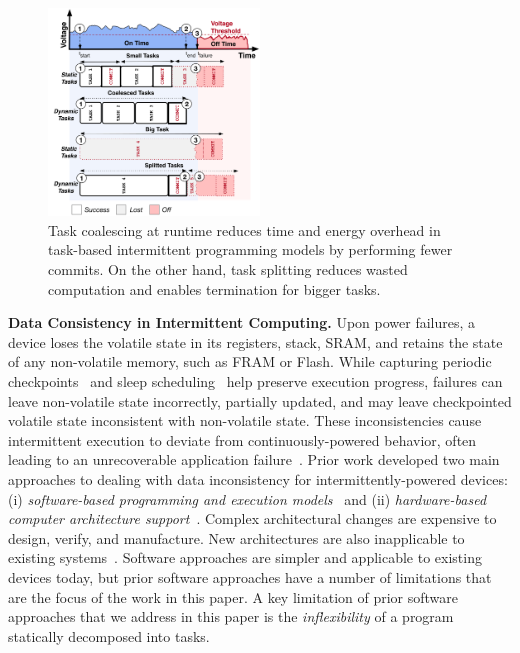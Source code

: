 \begin{figure}
    \centering
    \includegraphics[width=0.5\textwidth]{figures/graffle/intro-figure.pdf}
    \caption{Task coalescing at runtime reduces time and energy overhead in task-based intermittent programming models by performing fewer commits. On the other hand, task splitting reduces wasted computation and enables termination for bigger tasks.}
    \label{fig:coalesce}
\end{figure}

\textbf{Data Consistency in Intermittent Computing.}  
Upon power failures, a device loses the volatile
state in its registers, stack, SRAM, and retains the state of any non-volatile
memory, such as FRAM or Flash. While capturing periodic
checkpoints~\citep{mementos,quickrecall} and sleep
scheduling~\citep{dewdrop,hibernus,hibernusplusplus} help preserve execution
progress, failures can leave non-volatile state incorrectly, partially updated,
and may leave checkpointed volatile state inconsistent with non-volatile state.
These inconsistencies cause intermittent execution to deviate from
continuously-powered behavior, often leading to an unrecoverable
application failure~\citep{dino,edb}. Prior work developed two main approaches to dealing with data inconsistency for
intermittently-powered devices: (i) \emph{software-based programming and
execution models}~\citep{dino,ratchet,chain,alpaca} and (ii)
\emph{hardware-based computer architecture
support}~\citep{hicks_isca_2017,idetic,nvp}.  Complex architectural changes are
expensive to design, verify, and manufacture.  New architectures are also
inapplicable to existing systems~\citep{hicks_isca_2017,nvp}. Software
approaches are simpler and applicable to existing devices today, but prior
software approaches have a number of limitations that are the focus of the work
in this paper.  A key limitation of prior software approaches that we address in this paper is the {\em inflexibility} of a program statically decomposed into tasks. 


